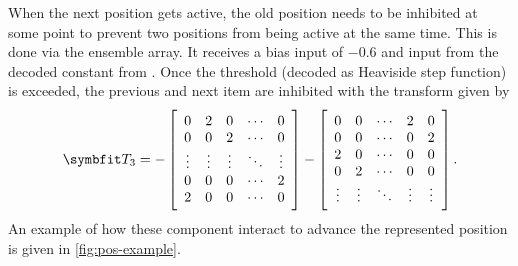 When the next position gets active, the old position needs to be inhibited at some point to prevent two positions from being active at the same time.
This is done via the  ensemble array.
It receives a bias input of \num{-0.6} and input from the decoded constant from .
Once the threshold (decoded as Heaviside step function) is exceeded, the previous and next item are inhibited with the transform given by
\begin{equation}
    \mat T_3 = -\sbr{\begin{array}{ccccc}
            0 & 2 & 0 & \cdots & 0 \\
            0 & 0 & 2 & \cdots & 0 \\
            \vdots & \vdots & \vdots & \ddots & \vdots \\
            0 & 0 & 0 & \cdots & 2 \\
            2 & 0 & 0 & \cdots & 0
    \end{array}} - \sbr{\begin{array}{ccccc}
        0 & 0 & \cdots & 2 & 0 \\
        0 & 0 & \cdots & 0 & 2 \\
        2 & 0 & \cdots & 0 & 0 \\
        0 & 2 & \cdots & 0 & 0 \\
        \vdots & \vdots & \ddots & \vdots & \vdots
    \end{array}} \text{.}
\end{equation}
An example of how these component interact to advance the represented position is given in \cref{fig:pos-example}.
